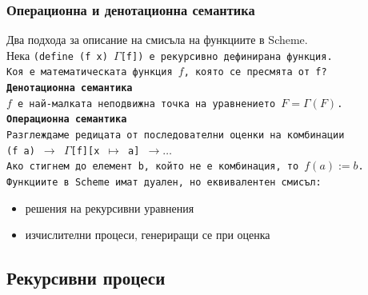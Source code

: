 \documentclass{beamer}
\begin{document}
\begin{frame}
  \frametitle{Операционна и денотационна семантика}

  Два подхода за описание на смисъла на функциите в Scheme.\\
  \pause
  Нека \tt{(define (f x) $\Gamma$[f])} е рекурсивно дефинирана функция.\\
  \pause
  \alert{Коя е математическата функция $f$, която се пресмята от \tt f?}\\[1em]
  \pause
  \textbf{Денотационна семантика}\\
  $f$ е най-малката неподвижна точка на уравнението $F = \Gamma(F)$.\\[1em]
  \pause
  \textbf{Операционна семантика}\\
  Разглеждаме редицата от последователни оценки на комбинации\\
  \tt{(f a)} $\rightarrow$ \tt{$\Gamma$[f][x $\mapsto$ a]} $\rightarrow\ldots$\\
  Ако стигнем до елемент \tt b, който не е комбинация, то $f(a) := b$.\\[1em]
  \pause
  \alert{Функциите в Scheme имат дуален, но еквивалентен смисъл:}
  \begin{itemize}
  \item решения на рекурсивни уравнения
  \item изчислителни процеси, генериращи се при оценка
  \end{itemize}
\end{frame}

\subsection{Рекурсивни процеси}
\end{document}
